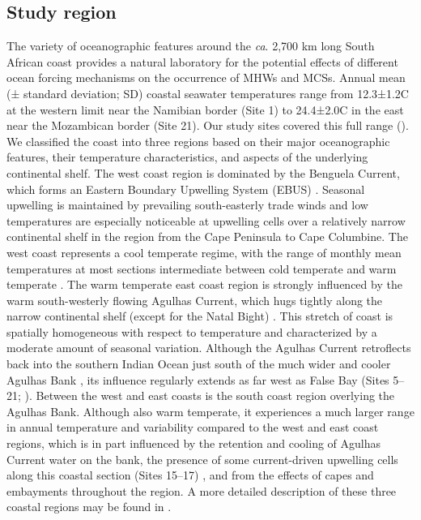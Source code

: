 \documentclass[a4paper,10pt,review]{elsarticle}
\begin{document}
\subsection{Study region}
The variety of oceanographic features around the \emph{ca}. 2,700 km long South African coast provides a natural laboratory for the potential effects of different ocean forcing mechanisms on the occurrence of MHWs and MCSs. Annual mean (± standard deviation; SD) coastal seawater temperatures range from 12.3±1.2\degree C at the western limit near the Namibian border (Site 1) to 24.4±2.0\degree C in the east near the Mozambican border (Site 21). Our study sites covered this full range (). We classified the coast into three regions based on their major oceanographic features, their temperature characteristics, and aspects of the underlying continental shelf. The west coast region is dominated by the Benguela Current, which forms an Eastern Boundary Upwelling System (EBUS) \citep{Hutchings2009}. Seasonal upwelling is maintained by prevailing south-easterly trade winds and low temperatures are especially noticeable at upwelling cells over a relatively narrow continental shelf in the region from the Cape Peninsula to Cape Columbine. The west coast represents a cool temperate regime, with the range of monthly mean temperatures at most sections intermediate between cold temperate and warm temperate \citep{Luning1990}. The warm temperate east coast region is strongly influenced by the warm south-westerly flowing Agulhas Current, which hugs tightly along the narrow continental shelf (except for the Natal Bight) \citep{Luning1990}. This stretch of coast is spatially homogeneous with respect to temperature and characterized by a moderate amount of seasonal variation. Although the Agulhas Current retroflects back into the southern Indian Ocean \citep{Hutchings2009} just south of the much wider and cooler Agulhas Bank \citep{Roberts2005}, its influence regularly extends as far west as False Bay (Sites 5--21; ). Between the west and east coasts is the south coast region overlying the Agulhas Bank. Although also warm temperate, it experiences a much larger range in annual temperature and variability compared to the west and east coast regions, which is in part influenced by the retention and cooling of Agulhas Current water on the bank, the presence of some current-driven upwelling cells along this coastal section (Sites 15--17) \citep{Roberts2005}, and from the effects of capes and embayments throughout the region. A more detailed description of these three coastal regions may be found in \citet{Smit2013}.
\end{document}
